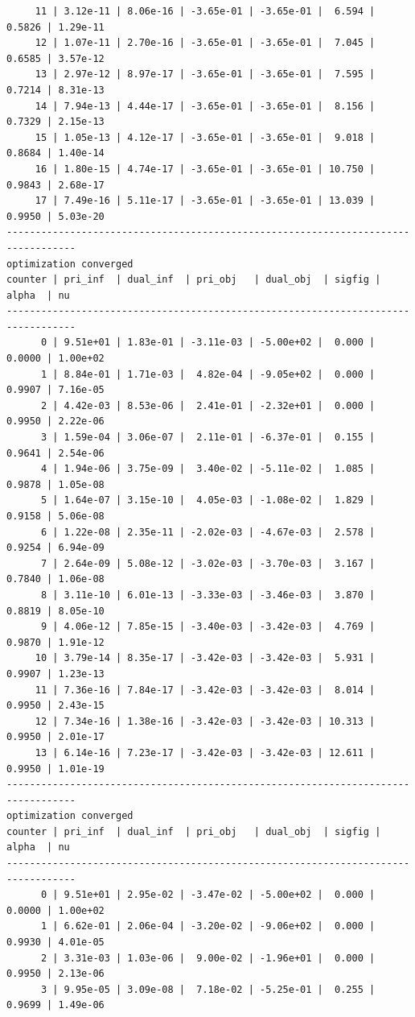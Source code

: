 \documentclass[
]{book}
\begin{document}
\begin{verbatim}
     11 | 3.12e-11 | 8.06e-16 | -3.65e-01 | -3.65e-01 |  6.594 | 0.5826 | 1.29e-11
     12 | 1.07e-11 | 2.70e-16 | -3.65e-01 | -3.65e-01 |  7.045 | 0.6585 | 3.57e-12
     13 | 2.97e-12 | 8.97e-17 | -3.65e-01 | -3.65e-01 |  7.595 | 0.7214 | 8.31e-13
     14 | 7.94e-13 | 4.44e-17 | -3.65e-01 | -3.65e-01 |  8.156 | 0.7329 | 2.15e-13
     15 | 1.05e-13 | 4.12e-17 | -3.65e-01 | -3.65e-01 |  9.018 | 0.8684 | 1.40e-14
     16 | 1.80e-15 | 4.74e-17 | -3.65e-01 | -3.65e-01 | 10.750 | 0.9843 | 2.68e-17
     17 | 7.49e-16 | 5.11e-17 | -3.65e-01 | -3.65e-01 | 13.039 | 0.9950 | 5.03e-20
----------------------------------------------------------------------------------
optimization converged
counter | pri_inf  | dual_inf  | pri_obj   | dual_obj  | sigfig | alpha  | nu 
----------------------------------------------------------------------------------
      0 | 9.51e+01 | 1.83e-01 | -3.11e-03 | -5.00e+02 |  0.000 | 0.0000 | 1.00e+02
      1 | 8.84e-01 | 1.71e-03 |  4.82e-04 | -9.05e+02 |  0.000 | 0.9907 | 7.16e-05
      2 | 4.42e-03 | 8.53e-06 |  2.41e-01 | -2.32e+01 |  0.000 | 0.9950 | 2.22e-06
      3 | 1.59e-04 | 3.06e-07 |  2.11e-01 | -6.37e-01 |  0.155 | 0.9641 | 2.54e-06
      4 | 1.94e-06 | 3.75e-09 |  3.40e-02 | -5.11e-02 |  1.085 | 0.9878 | 1.05e-08
      5 | 1.64e-07 | 3.15e-10 |  4.05e-03 | -1.08e-02 |  1.829 | 0.9158 | 5.06e-08
      6 | 1.22e-08 | 2.35e-11 | -2.02e-03 | -4.67e-03 |  2.578 | 0.9254 | 6.94e-09
      7 | 2.64e-09 | 5.08e-12 | -3.02e-03 | -3.70e-03 |  3.167 | 0.7840 | 1.06e-08
      8 | 3.11e-10 | 6.01e-13 | -3.33e-03 | -3.46e-03 |  3.870 | 0.8819 | 8.05e-10
      9 | 4.06e-12 | 7.85e-15 | -3.40e-03 | -3.42e-03 |  4.769 | 0.9870 | 1.91e-12
     10 | 3.79e-14 | 8.35e-17 | -3.42e-03 | -3.42e-03 |  5.931 | 0.9907 | 1.23e-13
     11 | 7.36e-16 | 7.84e-17 | -3.42e-03 | -3.42e-03 |  8.014 | 0.9950 | 2.43e-15
     12 | 7.34e-16 | 1.38e-16 | -3.42e-03 | -3.42e-03 | 10.313 | 0.9950 | 2.01e-17
     13 | 6.14e-16 | 7.23e-17 | -3.42e-03 | -3.42e-03 | 12.611 | 0.9950 | 1.01e-19
----------------------------------------------------------------------------------
optimization converged
counter | pri_inf  | dual_inf  | pri_obj   | dual_obj  | sigfig | alpha  | nu 
----------------------------------------------------------------------------------
      0 | 9.51e+01 | 2.95e-02 | -3.47e-02 | -5.00e+02 |  0.000 | 0.0000 | 1.00e+02
      1 | 6.62e-01 | 2.06e-04 | -3.20e-02 | -9.06e+02 |  0.000 | 0.9930 | 4.01e-05
      2 | 3.31e-03 | 1.03e-06 |  9.00e-02 | -1.96e+01 |  0.000 | 0.9950 | 2.13e-06
      3 | 9.95e-05 | 3.09e-08 |  7.18e-02 | -5.25e-01 |  0.255 | 0.9699 | 1.49e-06

\end{verbatim}
\end{document}
